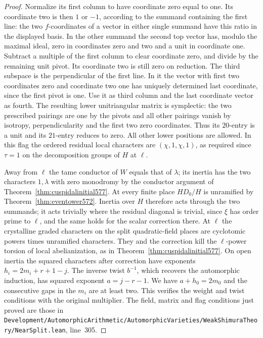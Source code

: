 \documentclass[a4paper,11pt]{article}
\theoremstyle{definition}
\theoremstyle{remark}
\newcommand{\srcloc}[2]{{\small\nolinkurl{#1.lean}}, line~#2}
\numberwithin{equation}{section}
\begin{document}
\begin{proof}
Normalize its first column to have coordinate zero equal
to one. Its coordinate two is then \(1\) or \(-1\),
according to the summand containing the first line: the
two \(f\)-coordinates of a vector in either single summand
have this ratio in the displayed basis. In the other
summand the second top vector has, modulo the maximal ideal,
zero in coordinates zero and two and a unit in coordinate
one. Subtract a multiple of the first column to clear
coordinate zero, and divide by the remaining unit pivot.
Its coordinate two is still zero on reduction. The third
subspace is the perpendicular of the first line. In it the
vector with first two coordinates zero and coordinate two
one has uniquely determined last coordinate, since the
first pivot is one. Use it as third column and the last
coordinate vector as fourth. The resulting lower
unitriangular matrix is symplectic: the two prescribed
pairings are one by the pivots and all other pairings vanish
by isotropy, perpendicularity and the first two zero
coordinates. Thus its \(20\)-entry is a unit and its
\(21\)-entry reduces to zero. All other lower positions
are allowed. In this flag the ordered residual local
characters are \((\chi,1,\chi,1)\), as required since
\(\tau=1\) on the decomposition groups of \(H\) at \(\ell\).

Away from \(\ell\) the tame conductor of \(W\) equals that
of \(\lambda\); its inertia has the two characters
\(1,\lambda\) with zero monodromy by the conductor argument
of Theorem~\ref{thm:cuspidalinitial577}. At every finite
place \(HD_0/H\) is unramified by
Theorem~\ref{thm:eventower572}. Inertia over \(H\) therefore
acts through the two summands; it acts trivially where the
residual diagonal is trivial, since \(\xi\) has order prime
to \(\ell\), and the same holds for the scalar correction
there. At \(\ell\) the crystalline graded characters on the
split quadratic-field places are cyclotomic powers times
unramified characters. They and the correction kill the
\(\ell\)-power torsion of local abelianization, as in
Theorem~\ref{thm:cuspidalinitial577}. On open inertia the
squared characters after correction have exponents
\(h_i=2m_i+r+1-j\). The inverse twist \(b^{-1}\), which
recovers the automorphic induction, has squared exponent
\(a=j-r-1\). We have \(a+h_0=2m_0\) and the consecutive
gaps in the \(m_i\) are at least two. This verifies the
weight and twist conditions with the original multiplier.
The field, matrix and flag conditions just proved are
those in \srcloc{Development/AutomorphicArithmetic/AutomorphicVarieties/WeakShimuraTheory/NearSplit}{305}.
\end{proof}
\end{document}
